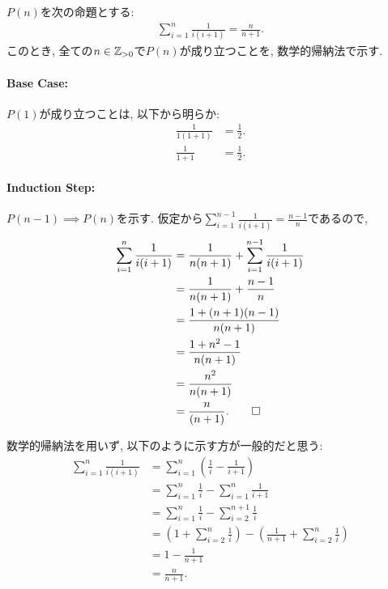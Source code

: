 \begin{proof*}
  $P(n)$を次の命題とする:
  \begin{align*}
    \sum_{i=1}^n\frac{1}{i(i+1)}=\frac{n}{n+1}.
  \end{align*}
  このとき,
  全ての$n\in\mathbb{Z}_{>0}$で$P(n)$が成り立つことを,
  数学的帰納法で示す.

  \paragraph{Base Case:}
  $P(1)$が成り立つことは, 以下から明らか:
  \begin{align*}
    \frac{1}{1(1+1)}&=\frac{1}{2}.\\
    \frac{1}{1+1}&=\frac{1}{2}.
  \end{align*}

  \paragraph{Induction Step:}
  $P(n-1)\implies P(n)$を示す.
  仮定から$\sum_{i=1}^{n-1}\frac{1}{i(i+1)}=\frac{n-1}{n}$であるので,
  \begin{align*}
    \sum_{i=1}^n\frac{1}{i(i+1)}
    &=\frac{1}{n(n+1)}+\sum_{i=1}^{n-1}\frac{1}{i(i+1)}\\
    &=\frac{1}{n(n+1)}+\frac{n-1}{n}\\
    &=\frac{1+(n+1)(n-1)}{n(n+1)}\\
    &=\frac{1+n^2-1}{n(n+1)}\\
    &=\frac{n^2}{n(n+1)}\\
    &=\frac{n}{(n+1)}
    .\qedhere
  \end{align*}
\end{proof*}
\begin{rem}
  数学的帰納法を用いず, 以下のように示す方が一般的だと思う:
  \begin{align*}
    \sum_{i=1}^n\frac{1}{i(i+1)}
    &=\sum_{i=1}^n(\frac{1}{i}-\frac{1}{i+1})\\
    &=\sum_{i=1}^n\frac{1}{i}-\sum_{i=1}^n\frac{1}{i+1}\\
    &=\sum_{i=1}^n\frac{1}{i}-\sum_{i=2}^{n+1}\frac{1}{i}\\
    &=(1+\sum_{i=2}^n\frac{1}{i})-(\frac{1}{n+1}+\sum_{i=2}^{n}\frac{1}{i})\\
    &=1-\frac{1}{n+1}\\
    &=\frac{n}{n+1}.
  \end{align*}
\end{rem}

